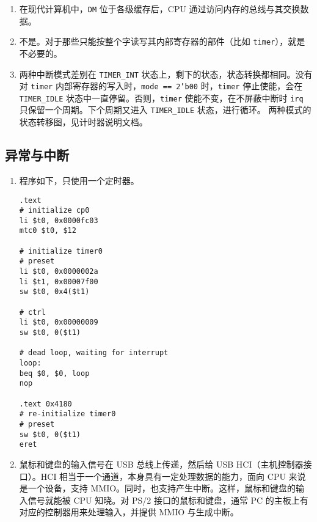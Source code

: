 \documentclass[12pt,AutoFakeBold,AutoFakeSlant]{article}
\providecommand{\tightlist}{%
  \setlength{\itemsep}{0pt}\setlength{\parskip}{0pt}}
\newcommand{\ms}[1]{\texttt{#1}}
\begin{document}
\begin{enumerate}
\tightlist
\item
在现代计算机中，\ms{DM} 位于各级缓存后，CPU 通过访问内存的总线与其交换数据。
\item
不是。对于那些只能按整个字读写其内部寄存器的部件（比如 \ms{timer}），就是不必要的。
\item
两种中断模式差别在 \ms{TIMER\_INT} 状态上，剩下的状态，状态转换都相同。没有对 \ms{timer} 内部寄存器的写入时，\ms{mode == 2'b00} 时，\ms{timer} 停止使能，会在 \ms{TIMER\_IDLE} 状态中一直停留。否则，\ms{timer} 使能不变，在不屏蔽中断时  \ms{irq} 只保留一个周期。下个周期又进入 \ms{TIMER\_IDLE} 状态，进行循环。
两种模式的状态转移图，见计时器说明文档。
\end{enumerate}

\subsection{异常与中断}

\begin{enumerate}
\tightlist
\item
程序如下，只使用一个定时器。
\begin{lstlisting}[language={[mips]Assembler}]
.text
# initialize cp0
li $t0, 0x0000fc03
mtc0 $t0, $12

# initialize timer0
# preset
li $t0, 0x0000002a
li $t1, 0x00007f00
sw $t0, 0x4($t1)

# ctrl
li $t0, 0x00000009
sw $t0, 0($t1)

# dead loop, waiting for interrupt
loop:
beq $0, $0, loop
nop

.text 0x4180
# re-initialize timer0
# preset
sw $t0, 0($t1)
eret
\end{lstlisting}
\item
鼠标和键盘的输入信号在 USB 总线上传递，然后给 USB HCI（主机控制器接口）。HCI 相当于一个通道，本身具有一定处理数据的能力，面向 CPU 来说是一个设备，支持 MMIO。同时，也支持产生中断。这样，鼠标和键盘的输入信号就能被 CPU 知晓。对 PS/2 接口的鼠标和键盘，通常 PC 的主板上有对应的控制器用来处理输入，并提供 MMIO 与生成中断。
\end{enumerate}
\end{document}
